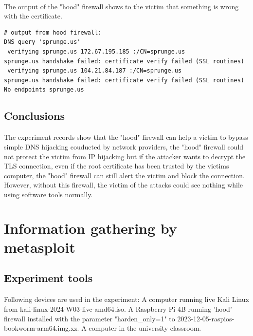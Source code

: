 \documentclass[mscthesis]{usiinfthesis}
\begin{document}
\paragraph{}
The output of the "hood" firewall shows to the victim that something is wrong with the certificate.

\begin{lstlisting}[language={},frame=single,breaklines=true,postbreak=\mbox{\textcolor{red}{$\hookrightarrow$}\space}]
# output from hood firewall:
DNS query 'sprunge.us'
 verifying sprunge.us 172.67.195.185 :/CN=sprunge.us
sprunge.us handshake failed: certificate verify failed (SSL routines)
 verifying sprunge.us 104.21.84.187 :/CN=sprunge.us
sprunge.us handshake failed: certificate verify failed (SSL routines)
No endpoints sprunge.us
\end{lstlisting}

\subsection{Conclusions}
\paragraph{}
The experiment records show that the "hood" firewall can help a victim to bypass simple DNS hijacking couducted by network providers, the "hood" firewall could not protect the victim from IP hijacking but if the attacker wants to decrypt the TLS connection, even if the root certificate has been trusted by the victims computer, the "hood" firewall can still alert the victim and block the connection. However, without this firewall, the victim of the attacks could see nothing while using software tools normally.

\section{Information gathering by metasploit}
\subsection{Experiment tools}
\paragraph{}
Following devices are used in the experiment: A computer running live Kali Linux from kali-linux-2024-W03-live-amd64.iso. A Raspberry Pi 4B running 'hood' firewall installed with the parameter "harden\_only=1" to 2023-12-05-raspios-bookworm-arm64.img.xz. A computer in the university classroom.
\end{document}
